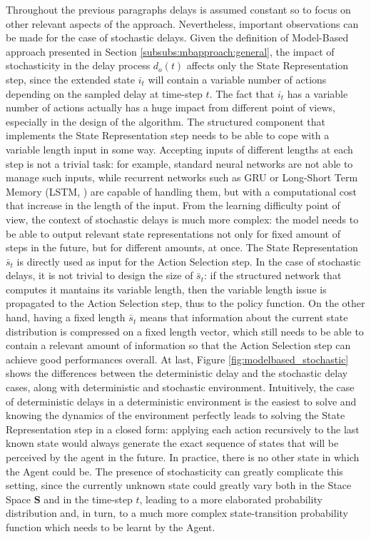                 Throughout the previous paragraphs delays is assumed constant so to focus on other relevant aspects of the approach. Nevertheless, important observations can be made for the case of stochastic delays. Given the definition of Model-Based approach presented in Section \ref{subsubs:mbapproach:general}, the impact of stochasticity in the delay process $d_o(t)$ affects only the State Representation step, since the extended state $i_t$ will contain a variable number of actions depending on the sampled delay at time-step $t$. The fact that $i_t$ has a variable number of actions actually has a huge impact from different point of views, especially in the design of the algorithm. \newline
                The structured component that implements the State Representation step needs to be able to cope with a variable length input in some way. Accepting inputs of different lengths at each step is not a trivial task: for example, standard neural networks are not able to manage such inputs, while recurrent networks such as GRU or Long-Short Term Memory (LSTM, ) are capable of handling them, but with a computational cost that increase in the length of the input. From the learning difficulty point of view, the context of stochastic delays is much more complex: the model needs to be able to output relevant state representations not only for fixed amount of steps in the future, but for different amounts, at once. \newline
                The State Representation $\bar{s}_t$ is directly used as input for the Action Selection step. In the case of stochastic delays, it is not trivial to design the size of $\bar{s}_t$: if the structured network that computes it  mantains its variable length, then the variable length issue is propagated to the Action Selection step, thus to the policy function. On the other hand, having a fixed length $\bar{s}_t$ means that information about the current state distribution is compressed on a fixed length vector, which still needs to be able to contain a relevant amount of information so that the Action Selection step can achieve good performances overall. \newline
                At last, Figure \ref{fig:modelbased_stochastic} shows the differences between the deterministic delay and the stochastic delay cases, along with deterministic and stochastic environment. Intuitively, the case of deterministic delays in a deterministic environment is the easiest to solve and knowing the dynamics of the environment perfectly leads to solving the State Representation step in a closed form: applying each action recursively to the last known state would always generate the exact sequence of states that will be perceived by the agent in the future. In practice, there is no other state in which the Agent could be. The presence of stochasticity can greatly complicate this setting, since the currently unknown state could greatly vary both in the Stace Space $\mathbf{S}$ and in the time-step $t$, leading to a more elaborated probability distribution and, in turn, to a much more complex state-transition probability function which needs to be learnt by the Agent. 
                
